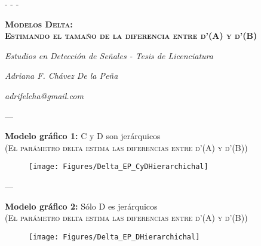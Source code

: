 \documentclass[a4paper ]{article}
\begin{document}
- - -

\vspace{50mm}
\begin{center}
{\Huge \textsc{\textbf{Modelos Delta:}}}\\
{\Huge \textsc{\textbf{Estimando el tamaño de la diferencia entre d'(A) y d'(B)}}}\\
\vspace{20mm}
\end{center}

\begin{center}
\textit{\huge Estudios en Detección de Señales - Tesis de Licenciatura}\\
\bigskip
\end{center}

\begin{center}
\textit{\huge Adriana F. Chávez De la Peña}\\
\end{center}

\begin{center}
\vfill
\textit{\huge adrifelcha@gmail.com}\\
\end{center}

\newpage




---
\vspace{3mm}
\begin{center}
{\LARGE \textbf{Modelo gráfico 1:} C y D son jerárquicos}\\
{\small \textsc{(El parámetro delta estima las diferencias entre d'(A) y d'(B))}}\\
\smallskip
\end{center}

\vspace{3mm}
\begin{figure}[th]
\centering
\texttt{[image: Figures/Delta\_EP\_CyDHierarchichal]}
\end{figure}
\clearpage



---
\vspace{3mm}
\begin{center}
{\LARGE \textbf{Modelo gráfico 2:} Sólo D es jerárquicos}\\
{\small \textsc{(El parámetro delta estima las diferencias entre d'(A) y d'(B))}}\\
\smallskip
\end{center}

\vspace{3mm}
\begin{figure}[th]
\centering
\texttt{[image: Figures/Delta\_EP\_DHierarchichal]}
\end{figure}
\clearpage
\end{document}
